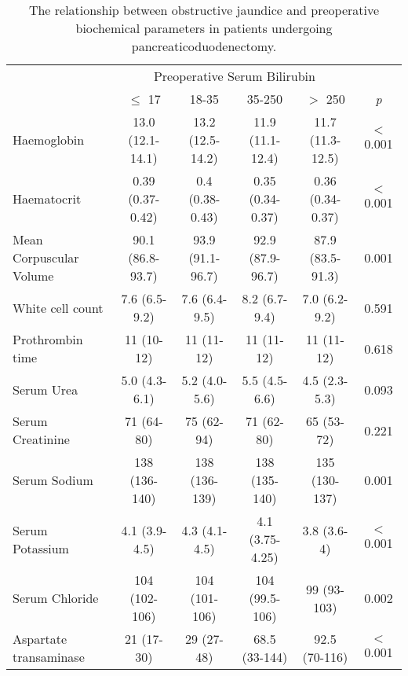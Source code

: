 	\begin{sidewaystable}[p]
		\caption{The relationship  between obstructive jaundice and preoperative biochemical parameters in patients undergoing pancreaticoduodenectomy. }
		\label{table:cpet_oj_bloods}
		\centering
		\renewcommand{\arraystretch}{1.4} %
		\setlength{\tabcolsep}{9pt} %
		
		\begin{tabular}{| l | c c c c c|}
			\hline
			                           &                   \multicolumn{4}{c}{Preoperative Serum Bilirubin}  &                 \\
			                           & $\leq$ 17        & 18-35            & 35-250           & $>$ 250          & \textit{p}       \\ \hline
			Haemoglobin                & 13.0 (12.1-14.1) & 13.2 (12.5-14.2) & 11.9 (11.1-12.4) & 11.7 (11.3-12.5) & $<$0.001 \\
			Haematocrit                & 0.39 (0.37-0.42) & 0.4 (0.38-0.43)  & 0.35 (0.34-0.37) & 0.36 (0.34-0.37) & $<$0.001 \\
			Mean Corpuscular Volume    & 90.1 (86.8-93.7) & 93.9 (91.1-96.7) & 92.9 (87.9-96.7) & 87.9 (83.5-91.3) & 0.001    \\
			White cell count           & 7.6 (6.5-9.2)    & 7.6 (6.4-9.5)    & 8.2 (6.7-9.4)    & 7.0 (6.2-9.2)    & 0.591    \\
			Prothrombin time           & 11 (10-12)       & 11 (11-12)       & 11 (11-12)       & 11 (11-12)       & 0.618    \\
			Serum Urea                 & 5.0 (4.3-6.1)    & 5.2 (4.0-5.6)    & 5.5 (4.5-6.6)    & 4.5 (2.3-5.3)    & 0.093    \\
			Serum Creatinine           & 71 (64-80)       & 75 (62-94)       & 71 (62-80)       & 65 (53-72)       & 0.221    \\
			Serum Sodium               & 138 (136-140)    & 138 (136-139)    & 138 (135-140)    & 135 (130-137)    & 0.001    \\
			Serum Potassium            & 4.1 (3.9-4.5)    & 4.3 (4.1-4.5)    & 4.1 (3.75-4.25)  & 3.8 (3.6-4)      & $<$0.001 \\
			Serum Chloride             & 104 (102-106)    & 104 (101-106)    & 104 (99.5-106)   & 99 (93-103)      & 0.002    \\
			Aspartate transaminase     & 21 (17-30)       & 29 (27-48)       & 68.5 (33-144)    & 92.5 (70-116)    & $<$0.001 \\

\end{tabular}
\end{sidewaystable}
